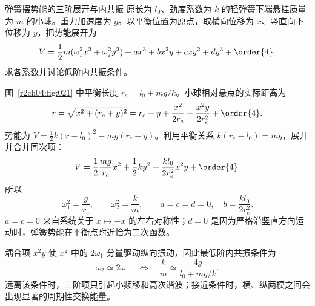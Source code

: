 \begin{practicebox}{弹簧摆势能的三阶展开与内共振}
原长为 $l_0$、劲度系数为 $k$ 的轻弹簧下端悬挂质量为 $m$ 的小球。重力加速度为 $g$。以平衡位置为原点，取横向位移为 $x$、竖直向下位移为 $y$，把势能展开为
\[
 V=\frac12m(\omega_1^2x^2+\omega_2^2y^2)+ax^3+bx^2y+cxy^2+dy^3+\order{4}.
\]
求各系数并讨论低阶内共振条件。
\label{r2ch04:pr:006}
\begin{solution}
图~\ref{r2ch04:fig:021} 中平衡长度
$r_e=l_0+mg/k$。小球相对悬点的实际距离为
\[
 r=\sqrt{x^2+(r_e+y)^2}
 =r_e+y+\frac{x^2}{2r_e}-\frac{x^2y}{2r_e^2}+\order{4}.
\]
势能为 $V=\tfrac12k(r-l_0)^2-mg(r_e+y)$。利用平衡关系 $k(r_e-l_0)=mg$，展开并合并同次项：
\begin{equation}
 V=\frac12\frac{mg}{r_e}x^2+\frac12ky^2
 +\frac{k l_0}{2r_e^2}x^2y+\order{4}.
 \label{r2ch04:eq:051}
\end{equation}
所以
\[
 \boxed{\omega_1^2=\frac g{r_e}},\qquad
 \boxed{\omega_2^2=\frac km},\qquad
 \boxed{a=c=d=0,\quad b=\frac{k l_0}{2r_e^2}}.
\]
$a=c=0$ 来自系统关于 $x\mapsto-x$ 的左右对称性；$d=0$ 是因为严格沿竖直方向运动时，弹簧势能在平衡点附近恰为二次函数。

耦合项 $x^2y$ 使 $x^2$ 中的 $2\omega_1$ 分量驱动纵向振动，因此最低阶内共振条件为
\begin{equation}
 \boxed{\omega_2\simeq2\omega_1}
 \quad\Longleftrightarrow\quad
 \boxed{\frac{k}{m}\simeq\frac{4g}{l_0+mg/k}}.
 \label{r2ch04:eq:052}
\end{equation}
远离该条件时，三阶项只引起小频移和高次谐波；接近条件时，横、纵两模之间会出现显著的周期性交换能量。
\figSpringPendulumExpansion
\end{solution}
\end{practicebox}
